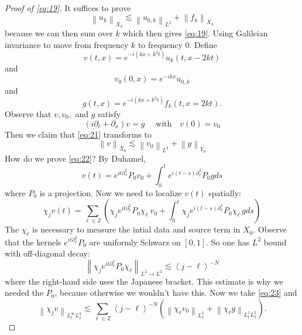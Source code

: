 \documentclass{article}
\newcommand\norm[1]{\left\lVert#1\right\rVert}
\begin{document}
\begin{proof}[Proof of \cref{eq:19}]
  It suffices to prove
  \begin{equation}\label{eq:21}
    \norm{u_{k}}_{X_{k}} \lesssim \norm{u_{0,k}}_{L^{2}} +\norm{f_{k}}_{X_{k}}
  \end{equation}
  because we can then sum over $k$ which then gives \cref{eq:19}. Using
  Galileian invariance to move from frequency $k$ to frequency $0$. Define
  \begin{equation}\label{eq:24}
    v(t,x) = e^{-i(kx+k^{2}t)}u_{k}(t,x-2kt)
  \end{equation}
  and
  \begin{equation*}
    v_{0}(0,x) = e^{-ikx}u_{0,k}
  \end{equation*}
  and
  \begin{equation*}
    g(t,x) = e^{-i(kx+k^{2}t)}f_{k}(t,x=2kt).
  \end{equation*}
  Observe that $v,v_{0},$ and $g$ satisfy
  \begin{equation*}
    (i\partial_{t}+\partial_{x})v = g \quad \text{ with}\quad v(0)=v_{0}
  \end{equation*}
  Then we claim that \cref{eq:21} transforms to
  \begin{equation}\label{eq:22}
    \norm{v}_{X_{0}} \lesssim \norm{v_{0}}_{L^{2}}+\norm{g}_{Y_{0}}
  \end{equation}
  How do we prove \cref{eq:22}? By Duhamel,
  \begin{equation*}
    v(t) 
    = e^{it\partial_{x}^{2}}P_{0}v_{0}
    + \int_{0}^{t}e^{i(t-s)\partial_{x}^{2}}P_{0}gds 
  \end{equation*}
  where $P_{0}$ is a projection. Now we need to localize $v(t)$ spatially:
  \begin{equation}\label{eq:23}
    \chi_{j}v(t) 
    = \sum_{\ell\in\mathbb{Z}}\left(\chi_{j}e^{it\partial_{x}^{2}}
      P_{0}\chi_{\ell}\ v_{0}
      +\int_{0}^{t}\chi_{j}e^{i(t-s)\partial_{x}^{2}}
      P_{0}\chi_{\ell}\ g ds  \right)  
  \end{equation}
  The $\chi_{\ell}$ is necessary to measure the intial data and source term in
  $X_{0}$. Observe that the kernels $e^{it\partial_{x}^{2}}P_{0}$ are uniformly
  Schwarz on $[0,1]$. So one has $L^{2}$ bound with off-diagonal decay:
  \begin{equation*}
    \norm{\chi_{j}e^{it\partial_{x}^{2}}P_{0}\chi_{\ell}}_{L^2\to L^2}
    \lesssim
    \left\langle j-\ell \right\rangle^{-N}
  \end{equation*}
  where the right-hand side uses the Japanese bracket. This estimate is why we
  needed the $P_{0}$, because otherwise we wouldn't have this. Now we take
  \cref{eq:23} and
  \begin{equation*}
    \norm{\chi_{j}v}_{L_{t}^{\infty}L_{x}^{2}} \lesssim \sum_{\ell\in \mathbb{Z}} \left\langle j-\ell \right\rangle^{-N}\left( \norm{\chi_{\ell}v_{0}}_{L_{x}^{2}}+\norm{\chi_{\ell}g}_{L_{t}^{1}L_{x}^{2}} \right). 
  \end{equation*}
\end{proof}
\end{document}
